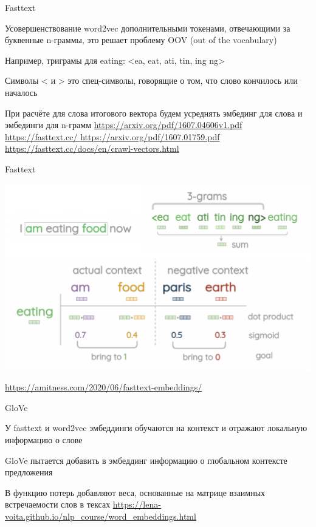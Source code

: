 \documentclass[notes,12pt, aspectratio=169]{beamer}
\newenvironment{wideitemize}{\itemize\addtolength{\itemsep}{10pt}}{\enditemize}
\begin{document}
\begin{frame}{Fasttext} 
	\begin{wideitemize}
		\item  Усовершенствование word2vec дополнительными токенами, отвечающими за буквенные n-граммы, это решает проблему OOV (out of the vocabulary)
		\item  Например, триграмы для eating:  <ea, eat, ati, tin, ing ng>
		\item  Символы < и > это спец-символы, говорящие о том, что слово
		кончилось или началось
		\item При расчёте для слова итогового вектора будем усреднять эмбединг для слова и эмбединги для n-грамм
	\end{wideitemize}
	\vfill
	\footnotesize  {\color{blue} \url{https://arxiv.org/pdf/1607.04606v1.pdf }} \hfill \color{blue} \url{https://fasttext.cc/ } \newline 
	\color{blue} \url{https://arxiv.org/pdf/1607.01759.pdf } \hfill  \color{blue} \url{https://fasttext.cc/docs/en/crawl-vectors.html} \newline 
\end{frame}


\begin{frame}{Fasttext} 
	\begin{center}
		\includegraphics[width=.75\linewidth]{fasttext.png}
	\end{center}
	\vfill
	\footnotesize  {\color{blue} \url{https://amitness.com/2020/06/fasttext-embeddings/}}
\end{frame}


\begin{frame}{GloVe} 
	\begin{wideitemize}
		\item   У fasttext и word2vec эмбеддинги обучаются на контекст и отражают локальную информацию о слове
		\item  GloVe пытается добавить в эмбеддинг информацию о глобальном контексте предложения 
		\item  В функцию потерь добавляют веса, основанные на матрице взаимных встречаемости слов в тексах
	\end{wideitemize}
	\vfill
\footnotesize  {\color{blue} \url{https://lena-voita.github.io/nlp_course/word_embeddings.html}}
\end{frame}
\end{document}
